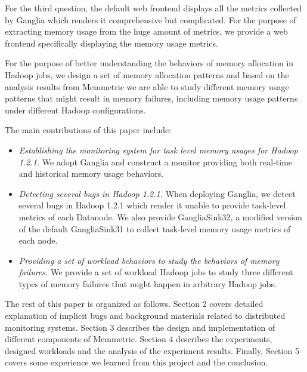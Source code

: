 For the third question, the default web frontend displays all the metrics collected by Ganglia which renders it comprehensive but complicated. For the purpose of extracting memory usage from the huge amount of metrics, we provide a web frontend specifically displaying the memory usage metrics.
\par
For the purpose of better understanding the behaviors of memory allocation in Hadoop jobs, we design a set of memory allocation patterns and based on the analysis results from Memmetric we are able to study different memory usage patterns that might result in memory failures, including memory usage patterns under different Hadoop configurations.
\par
The main contributions of this paper include:
\begin{itemize}
	\setlength{\itemsep}{1pt}
	 \setlength{\parskip}{0pt}
	 \setlength{\parsep}{0pt}
	\item
		\emph{ Establishing the monitoring system for task level memory usages for Hadoop 1.2.1.} We adopt Ganglia and construct a monitor providing both real-time and historical memory usage behaviors.
	\item
		\emph{ Detecting several bugs in Hadoop 1.2.1.} When deploying Ganglia, we detect several bugs in Hadoop 1.2.1 which render it unable to provide task-level metrics of each Datanode. We also provide GangliaSink32, a modified version of the default GangliaSink31 to collect task-level memory usage metrics of each node.
	\item
		\emph{ Providing a set of workload behaviors to study the behaviors of memory failures.} We provide a set of workload Hadoop jobs to study three different types of memory failures that might happen in arbitrary Hadoop jobs.
\end{itemize}

The rest of this paper is organized as follows. Section 2 covers detailed explanation of implicit bugs and background materials related to distributed monitoring systems. Section 3 describes the design and implementation of different components of Memmetric. Section 4 describes the experiments, designed workloads and the analysis of the experiment results. Finally, Section 5 covers some experience we learned from this project and the conclusion.


